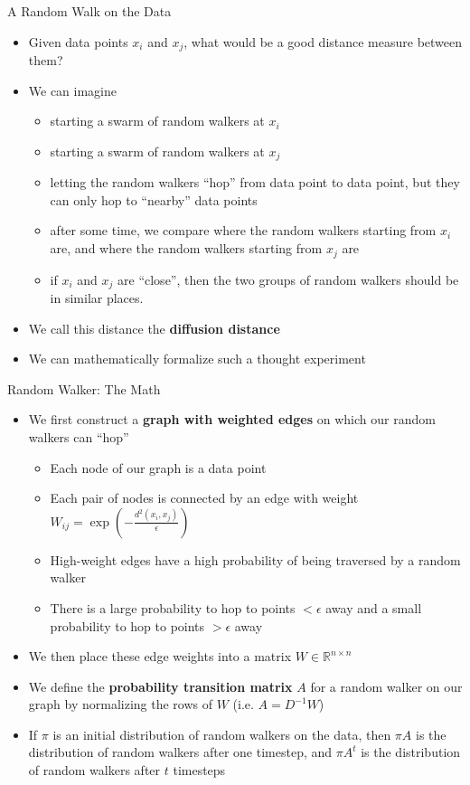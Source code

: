 \documentclass{beamer}
\begin{document}
\begin{frame}{A Random Walk on the Data}
\begin{itemize}
\item Given data points $x_i$ and $x_j$, what would be a good distance measure between them?
\item We can imagine
\begin{itemize}
\item starting a swarm of random walkers at $x_i$
\item starting a swarm of random walkers at $x_j$
\item letting the random walkers ``hop'' from data point to data point, but they can only hop to ``nearby'' data points
\item after some time, we compare where the random walkers starting from $x_i$ are, and where the random walkers starting from $x_j$ are
\item if $x_i$ and $x_j$ are ``close'', then the two groups of random walkers should be in similar places.
\end{itemize}
\item We call this distance the {\bf diffusion distance}
\item We can mathematically formalize such a thought experiment
\end{itemize}
\end{frame}

\begin{frame}{Random Walker: The Math}
\begin{itemize}
\item We first construct a {\bf graph with weighted edges} on which our random walkers can ``hop''
\begin{itemize}
\item Each node of our graph is a data point
\item Each pair of nodes is connected by an edge with weight $W_{ij} = \exp \left( -\frac{d^2(x_i, x_j)}{\epsilon} \right)$
\item High-weight edges have a high probability of being traversed by a random walker
\item There is a large probability to hop to points $< \epsilon$ away and a small probability to hop to points $> \epsilon$ away
\end{itemize}
\item We then place these edge weights into a matrix $W \in \mathbb{R}^{n \times n}$
\item We define the {\bf probability transition matrix} $A$ for a random walker on our graph by normalizing the rows of $W$ (i.e. $A = D^{-1}W$)
\item If $\pi$ is an initial distribution of random walkers on the data, then $\pi A$ is the distribution of random walkers after one timestep, and $\pi A^t$ is the distribution of random walkers after $t$ timesteps
\end{itemize}
\end{frame}
\end{document}
